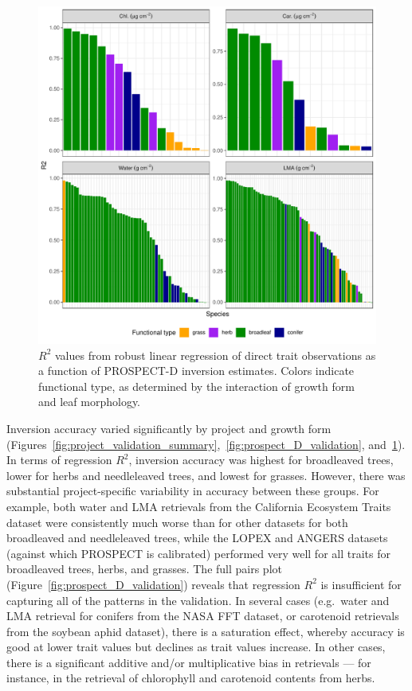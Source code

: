 \begin{figure}
  \centering
  \includegraphics[width=\textwidth]{3_prospect/figures/r2_by_gf.pdf}
  \caption{%
    $R^2$ values from robust linear regression of direct trait observations as a function of PROSPECT-D inversion estimates.
    Colors indicate functional type, as determined by the interaction of growth form and leaf morphology.
  }\label{fig:prospect_D_r2}
\end{figure}

Inversion accuracy varied significantly by project and growth form (Figures~\ref{fig:project_validation_summary},~\ref{fig:prospect_D_validation}, and~\ref{fig:prospect_D_r2}).
In terms of regression $R^2$, inversion accuracy was highest for broadleaved trees, lower for herbs and needleleaved trees, and lowest for grasses.
However, there was substantial project-specific variability in accuracy between these groups.
For example, both water and LMA retrievals from the California Ecosystem Traits dataset were consistently much worse than for other datasets for both broadleaved and needleleaved trees, while the LOPEX and ANGERS datasets (against which PROSPECT is calibrated) performed very well for all traits for broadleaved trees, herbs, and grasses.
The full pairs plot (Figure~\ref{fig:prospect_D_validation}) reveals that regression $R^2$ is insufficient for capturing all of the patterns in the validation.
In several cases (e.g.\ water and LMA retrieval for conifers from the NASA FFT dataset, or carotenoid retrievals from the soybean aphid dataset), there is a saturation effect, whereby accuracy is good at lower trait values but declines as trait values increase.
In other cases, there is a significant additive and/or multiplicative bias in retrievals --- for instance, in the retrieval of chlorophyll and carotenoid contents from herbs.

